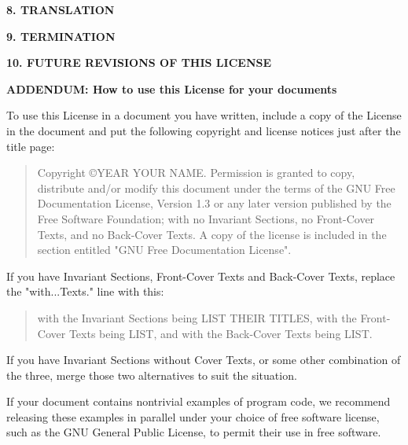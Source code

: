 \documentclass[a4paper,11pt]{article}
\begin{document}
\begin{center}
  {\Large\bf 8. TRANSLATION}
\end{center}



\begin{center}
  {\Large\bf 9. TERMINATION}
\end{center}


\begin{center}
  {\Large\bf 10. FUTURE REVISIONS OF THIS LICENSE}
\end{center}


\begin{center}
  {\Large\bf ADDENDUM: How to use this License for your documents}
\end{center}

To use this License in a document you have written, include a copy of
the License in the document and put the following copyright and
license notices just after the title page:

\bigskip
\begin{quote}
  Copyright  \copyright  YEAR  YOUR NAME.
  Permission is granted to copy, distribute and/or modify this document
  under the terms of the GNU Free Documentation License, Version 1.3
  or any later version published by the Free Software Foundation;
  with no Invariant Sections, no Front-Cover Texts, and no Back-Cover Texts.
  A copy of the license is included in the section entitled 
  "GNU Free Documentation License".
\end{quote}
\bigskip

If you have Invariant Sections, Front-Cover Texts and Back-Cover Texts,
replace the "with...Texts." line with this:

\bigskip
\begin{quote}
  with the Invariant Sections being LIST THEIR TITLES, with the
  Front-Cover Texts being LIST, and with the Back-Cover Texts being LIST.
\end{quote}
\bigskip

If you have Invariant Sections without Cover Texts, or some other combination 
of the three, merge those two alternatives to suit the situation.

If your document contains nontrivial examples of program code, we recommend 
releasing these examples in parallel under your choice of free software 
license, such as the GNU General Public License, to permit their use in 
free software. 






%
\end{document}
